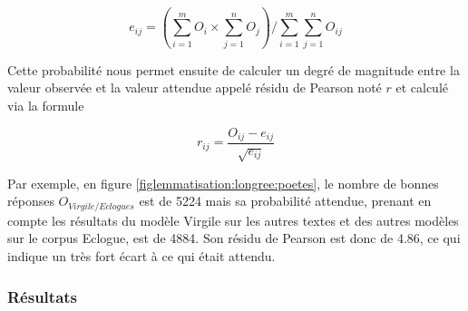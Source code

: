 \begin{equation}
    e_{ij} = \left ( \sum_{i=1}^{m}O_{i} \times \sum_{j=1}^{n}O_{j}  \right ) / \sum_{i=1}^{m}\sum_{j=1}^{n}O_{ij}
\end{equation}

Cette probabilité nous permet ensuite de calculer un degré de magnitude entre la valeur observée et la valeur attendue appelé résidu de Pearson noté $r$ et calculé via la formule

\begin{equation}
    r_{ij} = \frac{O_{ij} - e_{ij}}{\sqrt{e_{ij}}}
\end{equation}

Par exemple, en figure \ref{figlemmatisation:longree:poetes}, le nombre de bonnes réponses $O_{Virgile/Eclogues}$ est de 5224 mais sa probabilité attendue, prenant en compte les résultats du modèle Virgile sur les autres textes et des autres modèles sur le corpus Eclogue, est de 4884. Son résidu de Pearson est donc de 4.86, ce qui indique un très fort écart à ce qui était attendu.

\subsubsection{Résultats}

